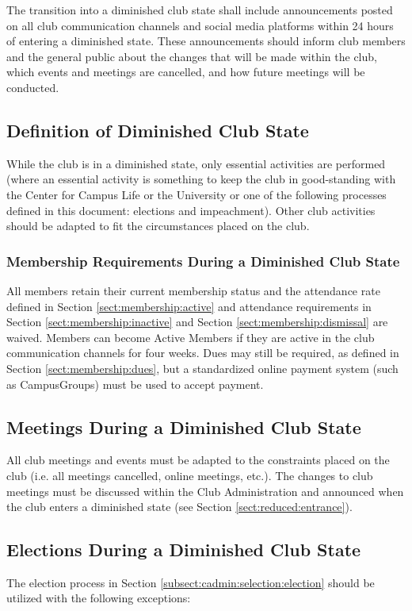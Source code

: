 \documentclass[english,11pt]{article}
\begin{document}
The transition into a diminished club state shall include announcements posted on all club communication channels and social media platforms within 24 hours of entering a diminished state.
These announcements should inform club members and the general public about the changes that will be made within the club, which events and meetings are cancelled, and how future meetings will be conducted.

\subsection{Definition of Diminished Club State} \label{sect:reduced:definition}
While the club is in a diminished state, only essential activities are performed (where an essential activity is something to keep the club in good-standing with the Center for Campus Life or the University or one of the following processes defined in this document: elections and impeachment).
Other club activities should be adapted to fit the circumstances placed on the club.

\subsubsection{Membership Requirements During a Diminished Club State} \label{subsect:reduced:membership}
All members retain their current membership status and the attendance rate defined in Section \ref{sect:membership:active} and attendance requirements in Section \ref{sect:membership:inactive} and Section \ref{sect:membership:dismissal} are waived.
Members can become Active Members if they are active in the club communication channels for four weeks.
Dues may still be required, as defined in Section \ref{sect:membership:dues}, but a standardized online payment system (such as CampusGroups) must be used to accept payment.

\subsection{Meetings During a Diminished Club State} \label{subsect:reduced:meetings}
All club meetings and events must be adapted to the constraints placed on the club (i.e. all meetings cancelled, online meetings, etc.).
The changes to club meetings must be discussed within the Club Administration and announced when the club enters a diminished state (see Section \ref{sect:reduced:entrance}).

\subsection{Elections During a Diminished Club State} \label{subsect:reduced:cadmin}
The election process in Section \ref{subsect:cadmin:selection:election} should be utilized with the following exceptions:
\end{document}
